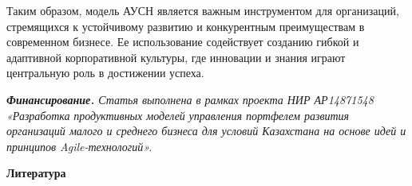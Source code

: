 \begin{multicols}{2}
Таким образом, модель АУСН является важным инструментом для организаций,
стремящихся к устойчивому развитию и конкурентным преимуществам в
современном бизнесе. Ее использование содействует созданию гибкой и
адаптивной корпоративной культуры, где инновации и знания играют
центральную роль в достижении успеха.

\emph{{\bfseries Финансирование.} Статья выполнена в рамках проекта НИР
АР14871548 «}\emph{Разработка} \emph{продуктивных моделей}
\emph{управления портфелем развития организаций малого и среднего
бизнеса для условий Казахстана на основе идей и принципов
Agile-технологий».}
\end{multicols}


\begin{center}
  {\bfseries Литература}
  \end{center}
  
